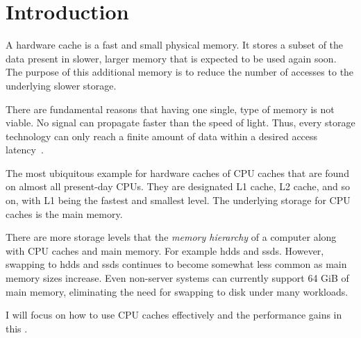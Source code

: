 \section{Introduction}

A hardware cache is a  fast and small physical memory.  It
stores a subset of the data present in slower, larger memory that is expected to be used
again soon.  The purpose of this additional memory is to reduce the number of accesses to
the underlying slower storage.

There are fundamental reasons that having one single,  type of
memory is not viable.  No signal can propagate faster than the speed of light.  Thus,
every storage technology can only reach a finite amount of data within a desired access
latency~\cite[2]{afmh}.

The most ubiquitous example for hardware caches  of CPU caches that are found on almost all present-day
CPUs.  They are designated L1 cache, L2 cache, and so on, with L1 being the fastest and
smallest level.  The underlying storage for CPU caches is the main memory.

There are more storage levels that  the \emph{memory hierarchy}
of a computer along with CPU caches and main memory.  For example \glspl{hdd} and
\glspl{ssd}.
However, swapping to \glspl{hdd} and \glspl{ssd} continues to become somewhat less common
as main memory sizes increase.  Even non-server systems can currently support 64 GiB of
main memory, eliminating the need for swapping to disk under many workloads.

I will focus on how to use CPU caches effectively and the 
performance gains in this \article{}.


